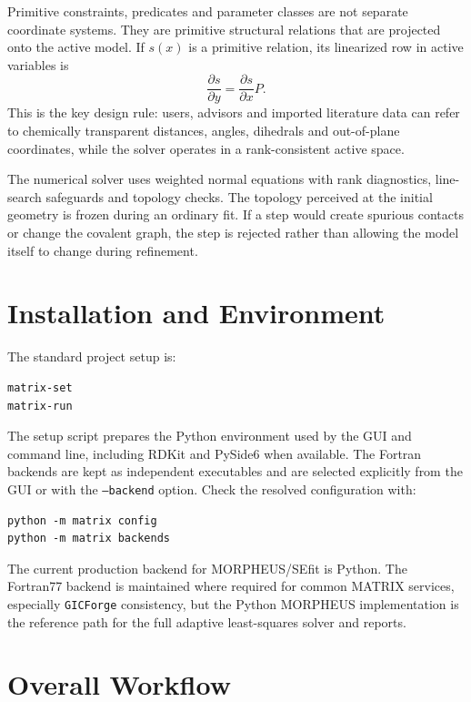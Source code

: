\documentclass[11pt]{article}
\newcommand{\gicforge}{\texttt{GICForge}}
\begin{document}
Primitive constraints, predicates and parameter classes are not separate
coordinate systems.  They are primitive structural relations that are projected
onto the active model.  If \(s(x)\) is a primitive relation, its linearized row
in active variables is
\[
  \frac{\partial s}{\partial y}
  =
  \frac{\partial s}{\partial x}P .
\]
This is the key design rule: users, advisors and imported literature data can
refer to chemically transparent distances, angles, dihedrals and out-of-plane
coordinates, while the solver operates in a rank-consistent active space.

The numerical solver uses weighted normal equations with rank diagnostics,
line-search safeguards and topology checks.  The topology perceived at the
initial geometry is frozen during an ordinary fit.  If a step would create
spurious contacts or change the covalent graph, the step is rejected rather
than allowing the model itself to change during refinement.

\section{Installation and Environment}

The standard project setup is:

\begin{lstlisting}[style=oracle]
matrix-set
matrix-run
\end{lstlisting}

\noindent
The setup script prepares the Python environment used by the GUI and command
line, including RDKit and PySide6 when available.  The Fortran backends are
kept as independent executables and are selected explicitly from the GUI or
with the \texttt{--backend} option.  Check the resolved configuration with:

\begin{lstlisting}[style=oracle]
python -m matrix config
python -m matrix backends
\end{lstlisting}

\noindent
The current production backend for MORPHEUS/SEfit is Python.  The Fortran77 backend
is maintained where required for common MATRIX services, especially
\gicforge{} consistency, but the Python MORPHEUS implementation is the
reference path for the full adaptive least-squares solver and reports.

\section{Overall Workflow}
\end{document}
